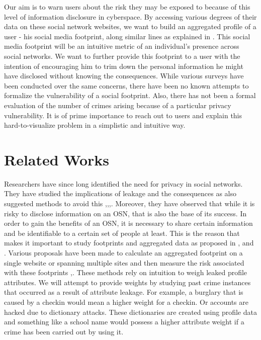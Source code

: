 \documentclass[12pt,conference]{IEEEtran}
\begin{document}
Our aim is to warn users about the risk they may be exposed to because of this level of information disclosure in cyberspace. By accessing various degrees of their data on these social network websites, we want to build an aggregated profile of a user - his social media footprint, along similar lines as explained in \cite{emergingthreat}. This social media footprint will be an intuitive metric of an individual’s presence across social networks. We want to further provide this footprint to a user with the intention of encouraging him to trim down the personal information he might have disclosed without knowing the consequences. While various surveys have been conducted over the same concerns, there have been no known attempts to formalize the vulnerability of a social footprint. Also, there has not been a formal evaluation of the number of crimes arising because of a particular privacy vulnerability. It is of prime importance to reach out to users and explain this hard-to-visualize problem in a simplistic and intuitive way.

\section{Related Works}
Researchers have since long identified the need for privacy in social networks. They have studied the implications of leakage and the consequences as also suggested methods to avoid this \cite{emergingthreat},\cite{inforevelation},\cite{privacypaper},\cite{undermining}. Moreover, they have observed that while it is risky to disclose information on an OSN, that is also the base of its success. In order to gain the benefits of an OSN, it is necessary to share certain information and be identifiable to a certain set of people at least. This is the reason that makes it important to study footprints and aggregated data as proposed in \cite{emergingthreat},\cite{leakage} and \cite{paas}. Various proposals have been made to calculate an aggregated footprint on a single website or spanning multiple sites and then measure the risk associated with these footprints \cite{socialgraph},\cite{framework}. These methods rely on intuition to weigh leaked profile attributes. We will attempt to provide weights by studying past crime instances that occurred as a result of attribute leakage. For example, a burglary that is caused by a checkin would mean a higher weight for a checkin. Or accounts are hacked due to dictionary attacks. These dictionaries are created using profile data and something like a school name would possess a higher attribute weight if a crime has been carried out by using it. \\
\end{document}
